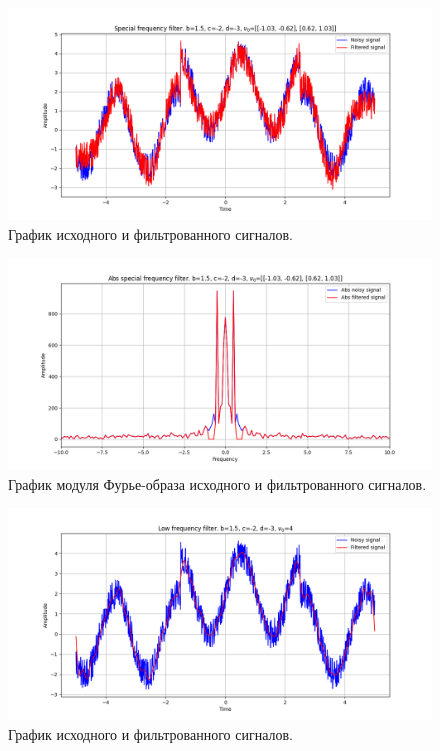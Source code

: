 \documentclass[a4paper, 12pt]{article}
\begin{document}
    \begin{figure}[!htb]
        \centering
        \includegraphics[scale=0.485]{5_u_flt_u_nospec.png}
        \captionsetup{skip=0pt}
        \caption{График исходного и фильтрованного сигналов.}
        \label{fig:fig93}
    \end{figure}
    \begin{figure}[!htb]
        \centering
        \includegraphics[scale=0.485]{5_abs_u_U_nospec.png}
        \captionsetup{skip=0pt}
        \caption{График модуля Фурье-образа исходного и фильтрованного сигналов.}
        \label{fig:fig94}
    \end{figure}
    \begin{figure}[!htb]
        \centering
        \includegraphics[scale=0.485]{5_1_u_flt_u_nospec.png}
        \captionsetup{skip=0pt}
        \caption{График исходного и фильтрованного сигналов.}
        \label{fig:fig95}
    \end{figure}
\end{document}
